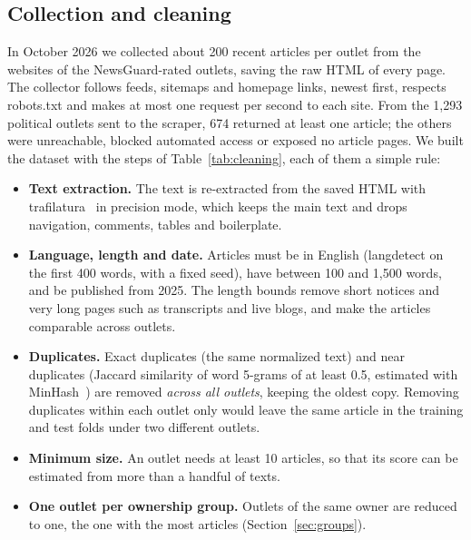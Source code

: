 \documentclass[11pt,a4paper]{article}
\begin{document}
\subsection{Collection and cleaning}\label{sec:cleaning}
In October 2026 we collected about 200 recent articles per outlet from the websites of the NewsGuard-rated outlets,
saving the raw HTML of every page. The collector follows feeds, sitemaps and homepage links, newest first, respects
robots.txt and makes at most one request per second to each site. From the 1,293 political outlets sent to the scraper, 674 returned at least one
article; the others were unreachable, blocked automated access or exposed no article pages. We built the dataset with
the steps of Table~\ref{tab:cleaning}, each of them a simple rule:
\begin{itemize}
  \item \textbf{Text extraction.} The text is re-extracted from the saved HTML with trafilatura~\cite{barbaresi2021trafilatura}
        in precision mode, which keeps the main text and drops navigation, comments, tables and boilerplate.
  \item \textbf{Language, length and date.} Articles must be in English (langdetect on the first 400 words, with a
        fixed seed), have between 100 and 1,500 words, and be published from 2025. The length bounds remove short
        notices and very long pages such as transcripts and live blogs, and make the articles comparable across outlets.
  \item \textbf{Duplicates.} Exact duplicates (the same normalized text) and near duplicates (Jaccard similarity of word
        5-grams of at least 0.5, estimated with MinHash~\cite{broder1997resemblance}) are removed \emph{across all
        outlets}, keeping the oldest copy. Removing duplicates within each outlet only would leave the same article in
        the training and test folds under two different outlets.
  \item \textbf{Minimum size.} An outlet needs at least 10 articles, so that its score can be estimated from more than
        a handful of texts.
  \item \textbf{One outlet per ownership group.} Outlets of the same owner are reduced to one, the one with the most
        articles (Section~\ref{sec:groups}).
\end{itemize}
\end{document}
